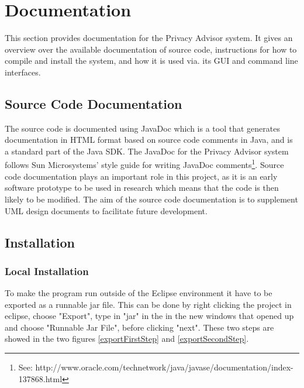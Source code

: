  

\chapter{Documentation}\label{doc}

\minitoc

This section provides documentation for the Privacy Advisor system. It gives an overview over the available documentation of source code, instructions for how to compile and install the system, and how it is used via. its GUI and command line interfaces.

\section{Source Code Documentation}

The source code is documented using JavaDoc which is 	a tool that generates documentation in HTML format based on source code comments in Java, and is a standard part of the Java SDK. The JavaDoc for the Privacy Advisor system follows Sun Microsystems' style guide for writing JavaDoc comments\footnote{See: http://www.oracle.com/technetwork/java/javase/documentation/index-137868.html}. Source code documentation plays an important role in this project, as it is an early software prototype to be used in research which means that the code is then likely to be modified. The aim of the source code documentation is to supplement UML design documents to facilitate future development.

\section{Installation}

\subsection{Local Installation}
To make the program run outside of the Eclipse environment it have to be exported as a runnable jar file. This can be done by right clicking the project in eclipse, choose "Export", type in "jar" in the in the new windows that opened up and choose "Runnable Jar File", before clicking "next". These two steps are showed in the two figures \ref{exportFirstStep} and \ref{exportSecondStep}.

